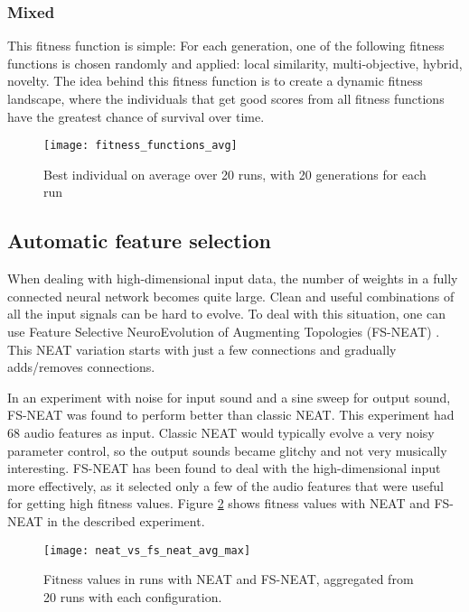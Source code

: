 \subsubsection{Mixed}
This fitness function is simple: For each generation, one of the following fitness functions is chosen randomly and applied: local similarity, multi-objective, hybrid, novelty. The idea behind this fitness function is to create a dynamic fitness landscape, where the individuals that get good scores from all fitness functions have the greatest chance of survival over time.

\begin{figure}[H]
    \centering
    \texttt{[image: fitness\_functions\_avg]}
    \caption{Best individual on average over 20 runs, with 20 generations for each run}
    \label{fig:fitness_functions_avg}
\end{figure}

\subsection{Automatic feature selection}
When dealing with high-dimensional input data, the number of weights in a fully connected neural network becomes quite large. Clean and useful combinations of all the input signals can be hard to evolve. To deal with this situation, one can use Feature Selective NeuroEvolution of Augmenting Topologies (FS-NEAT) \citep{whiteson2005}. This NEAT variation starts with just a few connections and gradually adds/removes connections.

In an experiment with noise for input sound and a sine sweep for output sound, FS-NEAT was found to perform better than classic NEAT. This experiment had 68 audio features as input. Classic NEAT would typically evolve a very noisy parameter control, so the output sounds became glitchy and not very musically interesting. FS-NEAT has been found to deal with the high-dimensional input more effectively, as it selected only a few of the audio features that were useful for getting high fitness values. Figure \ref{fig:neat_vs_fs_neat_avg_max} shows fitness values with NEAT and FS-NEAT in the described experiment.

\begin{figure}[H]
    \centering
    \texttt{[image: neat\_vs\_fs\_neat\_avg\_max]}
    \caption{Fitness values in runs with NEAT and FS-NEAT, aggregated from 20 runs with each configuration.}
    \label{fig:neat_vs_fs_neat_avg_max}
\end{figure}



